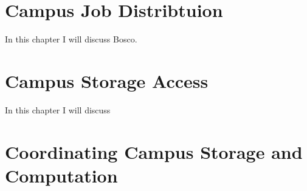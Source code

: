 \documentclass[print]{nuthesis}
\begin{document}


\chapter{Campus Job Distribtuion}
In this chapter I will discuss Bosco.

\chapter{Campus Storage Access}
In this chapter I will discuss


\chapter{Coordinating Campus Storage and Computation}



\backmatter

\appendix






\end{document}
